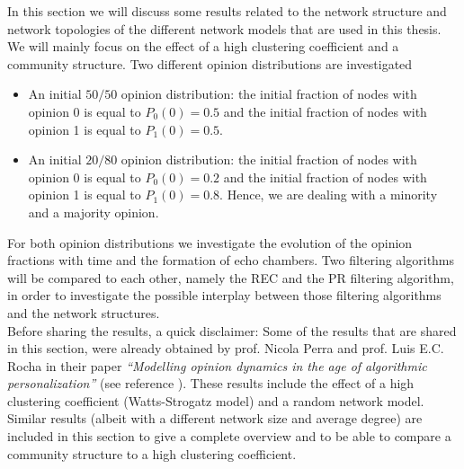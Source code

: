 \documentclass[11 pt , letterpaper , twoside , openright]{book}
\begin{document}
In this section we will discuss some results related to the network structure and network topologies of the different network models that are used in this thesis. We will mainly focus on the effect of a high clustering coefficient and a community structure. Two different opinion distributions are investigated
\begin{itemize}
	\item An initial $50/50$ opinion distribution: the initial fraction of nodes with opinion 0 is equal to $P_0(0) = 0.5$ and the initial fraction of nodes with opinion 1 is equal to $P_1(0) = 0.5$.
	\item An initial $20/80$ opinion distribution: the initial fraction of nodes with opinion 0 is equal to $P_0(0) = 0.2$ and the initial fraction of nodes with opinion 1 is equal to $P_1(0) = 0.8$. Hence, we are dealing with a minority and a majority opinion.
\end{itemize}
For both opinion distributions we investigate the evolution of the opinion fractions with time and the formation of echo chambers. Two filtering algorithms will be compared to each other, namely the REC and the PR filtering algorithm, in order to investigate the possible interplay between those filtering algorithms and the network structures.\\
\newline
Before sharing the results, a quick disclaimer: Some of the results that are shared in this section, were already obtained by prof. Nicola Perra and prof. Luis E.C. Rocha in their paper \textit{``Modelling opinion dynamics in the age of algorithmic personalization''} (see reference \cite{Perra2019}). These results include the effect of a high clustering coefficient (Watts-Strogatz model) and a random network model. Similar results (albeit with a different network size and average degree) are included in this section to give a complete overview and to be able to compare a community structure to a high clustering coefficient. 
\end{document}
